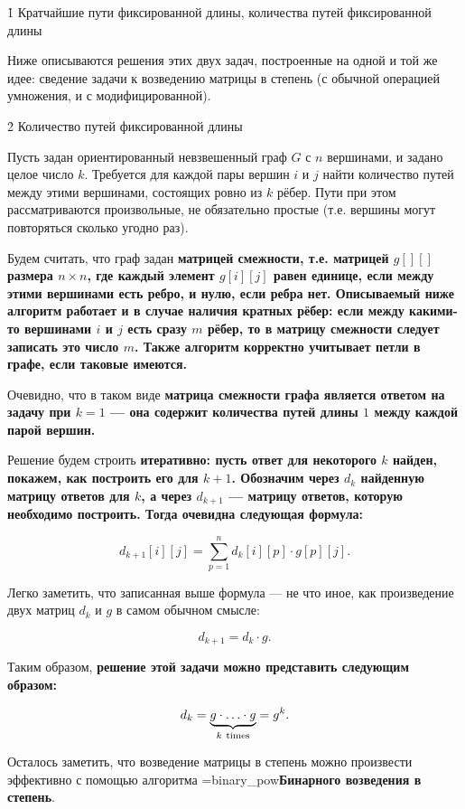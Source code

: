 \h1{ Кратчайшие пути фиксированной длины, количества путей фиксированной длины }

Ниже описываются решения этих двух задач, построенные на одной и той же идее: сведение задачи к возведению матрицы в степень (с обычной операцией умножения, и с модифицированной).


\h2{ Количество путей фиксированной длины }

Пусть задан ориентированный невзвешенный граф $G$ с $n$ вершинами, и задано целое число $k$. Требуется для каждой пары вершин $i$ и $j$ найти количество путей между этими вершинами, состоящих ровно из $k$ рёбер. Пути при этом рассматриваются произвольные, не обязательно простые (т.е. вершины могут повторяться сколько угодно раз).

Будем считать, что граф задан \bf{матрицей смежности}, т.е. матрицей $g[][]$ размера $n \times n$, где каждый элемент $g[i][j]$ равен единице, если между этими вершинами есть ребро, и нулю, если ребра нет. Описываемый ниже алгоритм работает и в случае наличия кратных рёбер: если между какими-то вершинами $i$ и $j$ есть сразу $m$ рёбер, то в матрицу смежности следует записать это число $m$. Также алгоритм корректно учитывает петли в графе, если таковые имеются.

Очевидно, что в таком виде \bf{матрица смежности} графа является \bf{ответом на задачу при $k=1$} --- она содержит количества путей длины $1$ между каждой парой вершин.

Решение будем строить \bf{итеративно}: пусть ответ для некоторого $k$ найден, покажем, как построить его для $k+1$. Обозначим через $d_k$ найденную матрицу ответов для $k$, а через $d_{k+1}$ --- матрицу ответов, которую необходимо построить. Тогда очевидна следующая формула:

$$ d_{k+1}[i][j] = \sum_{p = 1}^{n} d_k[i][p] \cdot g[p][j]. $$

Легко заметить, что записанная выше формула --- не что иное, как произведение двух матриц $d_k$ и $g$ в самом обычном смысле:

$$ d_{k+1} = d_k \cdot g. $$

Таким образом, \bf{решение} этой задачи можно представить следующим образом:

$$ d_k = \underbrace{ g \cdot \ldots \cdot g}_{k\ {\rm times}} = g^k. $$

Осталось заметить, что возведение матрицы в степень можно произвести эффективно с помощью алгоритма \algohref=binary_pow{\bf{Бинарного возведения в степень}}.

